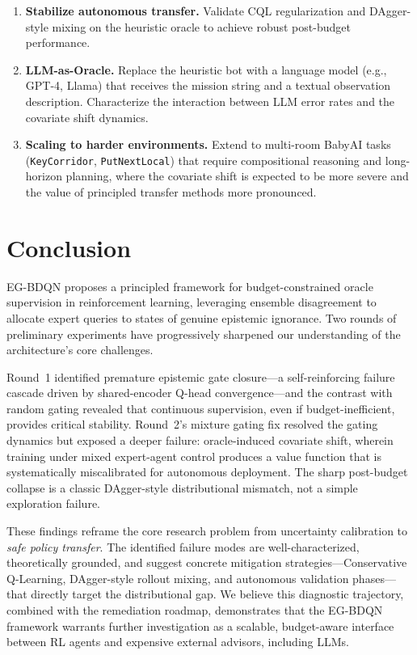 \documentclass[11pt, a4paper]{article}
\begin{document}
\begin{enumerate}[leftmargin=*, label=(\roman*)]
    \item \textbf{Stabilize autonomous transfer.} Validate CQL regularization and DAgger-style mixing on the heuristic oracle to achieve robust post-budget performance.
    \item \textbf{LLM-as-Oracle.} Replace the heuristic bot with a language model (e.g., GPT-4, Llama) that receives the mission string and a textual observation description. Characterize the interaction between LLM error rates and the covariate shift dynamics.
    \item \textbf{Scaling to harder environments.} Extend to multi-room BabyAI tasks (\texttt{KeyCorridor}, \texttt{PutNextLocal}) that require compositional reasoning and long-horizon planning, where the covariate shift is expected to be more severe and the value of principled transfer methods more pronounced.
\end{enumerate}


\section{Conclusion}

EG-BDQN proposes a principled framework for budget-constrained oracle supervision in reinforcement learning, leveraging ensemble disagreement to allocate expert queries to states of genuine epistemic ignorance. Two rounds of preliminary experiments have progressively sharpened our understanding of the architecture's core challenges.

Round~1 identified premature epistemic gate closure---a self-reinforcing failure cascade driven by shared-encoder Q-head convergence---and the contrast with random gating revealed that continuous supervision, even if budget-inefficient, provides critical stability. Round~2's mixture gating fix resolved the gating dynamics but exposed a deeper failure: oracle-induced covariate shift, wherein training under mixed expert-agent control produces a value function that is systematically miscalibrated for autonomous deployment. The sharp post-budget collapse is a classic DAgger-style distributional mismatch, not a simple exploration failure.

These findings reframe the core research problem from uncertainty calibration to \textit{safe policy transfer}. The identified failure modes are well-characterized, theoretically grounded, and suggest concrete mitigation strategies---Conservative Q-Learning, DAgger-style rollout mixing, and autonomous validation phases---that directly target the distributional gap. We believe this diagnostic trajectory, combined with the remediation roadmap, demonstrates that the EG-BDQN framework warrants further investigation as a scalable, budget-aware interface between RL agents and expensive external advisors, including LLMs.



\end{document}

